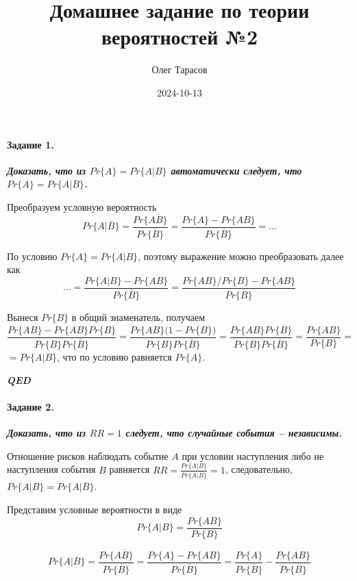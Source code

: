 \documentclass[12pt, a4paper]{article}
\title{Домашнее задание по теории вероятностей №2}
\author{Олег Тарасов}
\date{2024-10-13}
\let\oldparagraph\paragraph
\renewcommand{\paragraph}[1]{\oldparagraph{#1}\mbox{}}
\begin{document}
\maketitle

\paragraph{Задание 1.}\label{-1.}

\textit{\textbf{Доказать, что из \(Pr\{A\}=Pr\{A | B\}\) автоматически
следует, что \(Pr\{A\} = Pr\{A | \overline{B}\}\).}}

Преобразуем условную вероятность \[
Pr\{A | \overline{B} \} = \frac{Pr\{A\overline{B}\} }{Pr\{\overline{B}\} } = \frac{Pr\{A\} - Pr\{AB\} }{Pr\{\overline{B}\} } = ...
\]

По условию \(Pr\{A\} = Pr\{A | B\}\), поэтому выражение можно
преобразовать далее как \[
...= \frac{Pr\{A | B\} - Pr\{AB\} }{Pr\{\overline{B}\} } = \frac{ Pr\{AB\}/Pr\{B \} - Pr\{AB\} }{Pr\{\overline{B}\} }
\]

Вынеся \(Pr\{ B\}\) в общий знаменатель, получаем \[
\frac{ Pr\{AB\} - Pr\{AB\}Pr\{B \} }{Pr\{B \}Pr\{\overline{B}\} } = \frac{ Pr\{AB\}\big(1-Pr\{B \}\big) }{Pr\{B \}Pr\{\overline{B}\} } = \frac{ Pr\{AB\}Pr\{\overline{B} \} }{Pr\{B \}Pr\{\overline{B}\} } = \frac{ Pr\{AB\} }{Pr\{B \} } = \] 
\(= Pr\{A | B\}\), что по условию равняется \(Pr\{A\}\).

\begin{center}
    \textit{\textbf{QED}}    
\end{center}

\paragraph{Задание 2.}\label{-2.}

\textit{\textbf{Доказать, что из \(RR = 1\) следует, что случайные события
-- независимы.}}

Отношение рисков наблюдать событие \(A\) при условии наступления
либо не наступления события \(B\) равняется \(RR = \frac{Pr\{A | B\} }{Pr\{A | \overline{B} \} }=1\), следовательно, 
\(Pr\{A | B\} = Pr\{A | \overline{B} \}\).

Представим условные вероятности в виде \[
Pr\{A | B\} = \frac{Pr\{AB\} }{Pr\{B\} }
\]

\[
Pr\{A | \overline{B} \} = \frac{Pr\{A\overline{B}\} }{Pr\{\overline{B}\} } = \frac{Pr\{A\} - Pr\{AB\} }{Pr\{\overline{B}\} } = 
\frac{Pr\{A\} }{Pr\{\overline{B}\} } - \frac{Pr\{AB\}}{Pr\{\overline{B}\} }
\]
\end{document}

